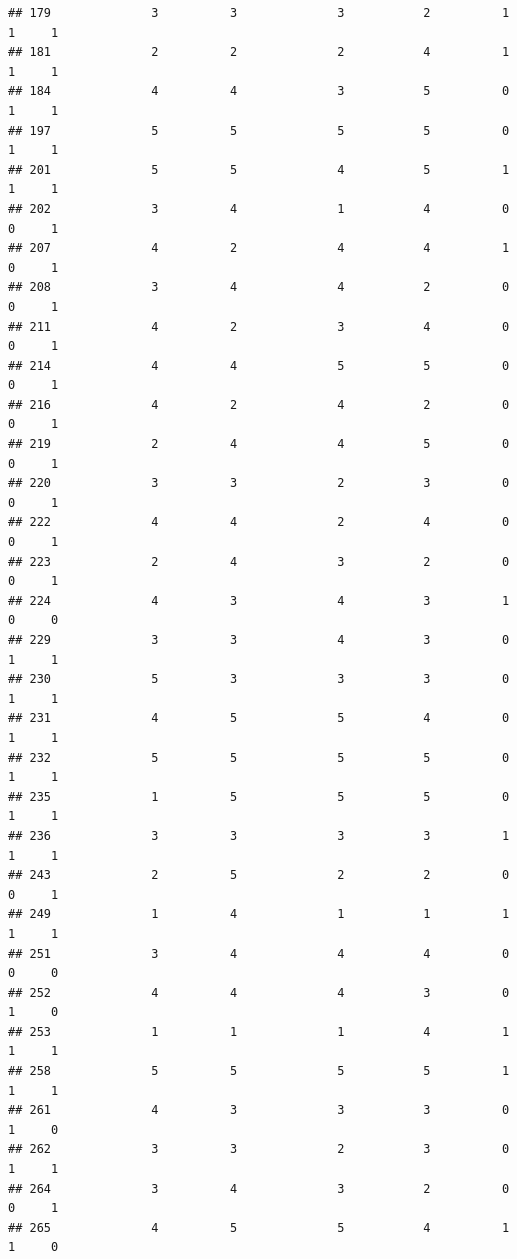 \documentclass[
]{article}
\begin{document}
\begin{verbatim}
## 179              3          3              3           2          1    1     1
## 181              2          2              2           4          1    1     1
## 184              4          4              3           5          0    1     1
## 197              5          5              5           5          0    1     1
## 201              5          5              4           5          1    1     1
## 202              3          4              1           4          0    0     1
## 207              4          2              4           4          1    0     1
## 208              3          4              4           2          0    0     1
## 211              4          2              3           4          0    0     1
## 214              4          4              5           5          0    0     1
## 216              4          2              4           2          0    0     1
## 219              2          4              4           5          0    0     1
## 220              3          3              2           3          0    0     1
## 222              4          4              2           4          0    0     1
## 223              2          4              3           2          0    0     1
## 224              4          3              4           3          1    0     0
## 229              3          3              4           3          0    1     1
## 230              5          3              3           3          0    1     1
## 231              4          5              5           4          0    1     1
## 232              5          5              5           5          0    1     1
## 235              1          5              5           5          0    1     1
## 236              3          3              3           3          1    1     1
## 243              2          5              2           2          0    0     1
## 249              1          4              1           1          1    1     1
## 251              3          4              4           4          0    0     0
## 252              4          4              4           3          0    1     0
## 253              1          1              1           4          1    1     1
## 258              5          5              5           5          1    1     1
## 261              4          3              3           3          0    1     0
## 262              3          3              2           3          0    1     1
## 264              3          4              3           2          0    0     1
## 265              4          5              5           4          1    1     0

\end{verbatim}
\end{document}
